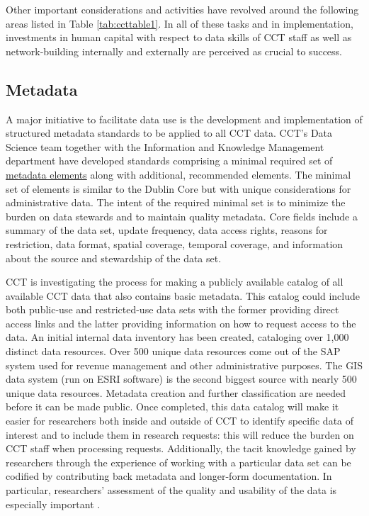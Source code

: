 Other important considerations and activities have revolved around the following areas listed in Table \ref{tab:ccttable1}. In all of these tasks and in implementation, investments in human capital with respect to data skills of CCT staff as well as network-building internally and externally are perceived as crucial to success.



\hypertarget{metadata-2}{%
\subsection{Metadata}\label{metadata-2}}

A major initiative to facilitate data use is the development and implementation of structured metadata standards to be applied to all CCT data. CCT's Data Science team together with the Information and Knowledge Management department have developed standards comprising a minimal required set of \href{http://osf.io/2a7ev}{metadata elements} along with additional, recommended elements. The minimal set of elements is similar to the Dublin Core but with unique considerations for administrative data. The intent of the required minimal set is to minimize the burden on data stewards and to maintain quality metadata. Core fields include a summary of the data set, update frequency, data access rights, reasons for restriction, data format, spatial coverage, temporal coverage, and information about the source and stewardship of the data set.

CCT is investigating the process for making a publicly available catalog of all available CCT data that also contains basic metadata. This catalog could include both public-use and restricted-use data sets with the former providing direct access links and the latter providing information on how to request access to the data. An initial internal data inventory has been created, cataloging over 1,000 distinct data resources. Over 500 unique data resources come out of the SAP system used for revenue management and other administrative purposes. The GIS data system (run on ESRI software) is the second biggest source with nearly 500 unique data resources. Metadata creation and further classification are needed before it can be made public. Once completed, this data catalog will make it easier for researchers both inside and outside of CCT to identify specific data of interest and to include them in research requests: this will reduce the burden on CCT staff when processing requests. Additionally, the tacit knowledge gained by researchers through the experience of working with a particular data set can be codified by contributing back metadata and longer-form documentation. In particular, researchers' assessment of the quality and usability of the data is especially important \citep{connelly2016}.

